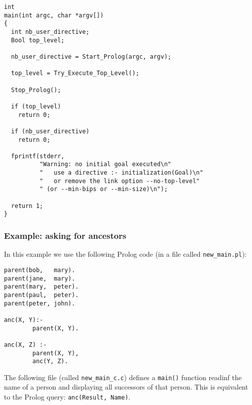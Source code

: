 \begin{Indentation}
\begin{verbatim}
int
main(int argc, char *argv[])
{
  int nb_user_directive;
  Bool top_level;

  nb_user_directive = Start_Prolog(argc, argv);

  top_level = Try_Execute_Top_Level();

  Stop_Prolog();

  if (top_level)
    return 0;

  if (nb_user_directive)
    return 0;

  fprintf(stderr,
          "Warning: no initial goal executed\n"
          "   use a directive :- initialization(Goal)\n"
          "   or remove the link option --no-top-level"
          " (or --min-bips or --min-size)\n");

  return 1;
}
\end{verbatim}
\end{Indentation}

\subsubsection{Example: asking for ancestors}

In this example we use the following Prolog code (in a file called 
\texttt{new\_main.pl}):

\begin{Indentation}
\begin{verbatim}
parent(bob,   mary).
parent(jane,  mary).
parent(mary,  peter).
parent(paul,  peter).
parent(peter, john).

anc(X, Y):-
        parent(X, Y).

anc(X, Z) :-
        parent(X, Y),
        anc(Y, Z).
\end{verbatim}
\end{Indentation}

The following file (called \texttt{new\_main\_c.c}) defines a \texttt{main()}
function readinf the name of a person and displaying all successors of that
person. This is equivalent to the Prolog query: \texttt{anc(Result, Name)}.

